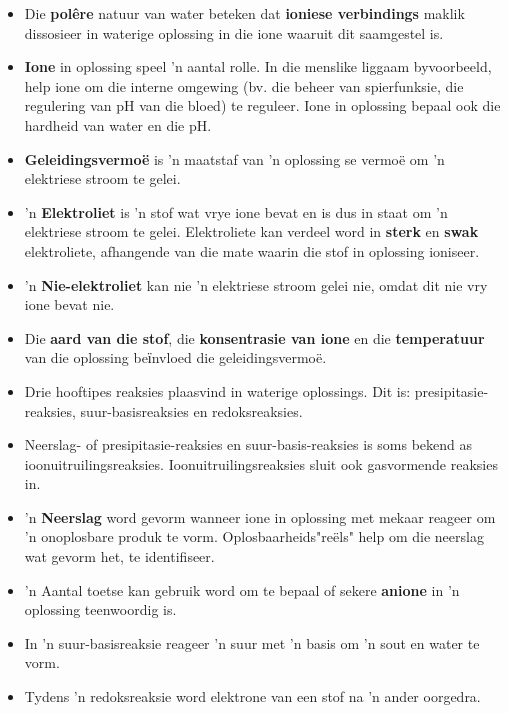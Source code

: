             \label{m38719*eip-903}\begin{itemize}[noitemsep]
            \label{m38719*uid95}\item Die \textbf{pol\^{e}re} natuur van water beteken dat \textbf{ioniese verbindings} maklik dissosieer in waterige oplossing in die ione waaruit dit saamgestel is. 
\label{m38719*uid96}\item \textbf{Ione} in oplossing speel 'n aantal rolle. In die menslike liggaam byvoorbeeld, help ione om die interne omgewing (bv. die beheer van spierfunksie, die regulering van pH van die bloed) te reguleer. Ione in oplossing bepaal ook die hardheid van water en die pH. 
\label{m38719*uid100}\item \textbf{Geleidingsvermo\"{e}} is 'n maatstaf van 'n oplossing se vermoë om 'n elektriese stroom te gelei.
\label{m38719*uid101}\item 'n \textbf{Elektroliet} is 'n stof wat vrye ione bevat en is dus in staat om  'n elektriese stroom te gelei. Elektroliete kan verdeel word in \textbf{sterk} en \textbf{swak} elektroliete, afhangende van die mate waarin die stof in oplossing ioniseer.
\label{m38719*uid102}\item 'n \textbf{Nie-elektroliet} kan nie  'n elektriese stroom gelei nie, omdat dit nie vry ione bevat nie.
\label{m38719*uid103}\item Die \textbf{aard van die stof}, die \textbf{konsentrasie van ione} en die \textbf{temperatuur} van die oplossing beїnvloed die geleidingsvermo\"{e}.
\label{m38719*uid0253}\item Drie hooftipes reaksies plaasvind in waterige oplossings. Dit is: presipitasie-reaksies, suur-basisreaksies en redoksreaksies.
\label{m38719*uid8923}\item Neerslag- of presipitasie-reaksies en suur-basis-reaksies is soms bekend as ioonuitruilingsreaksies. Ioonuitruilingsreaksies sluit ook gasvormende reaksies in.
\label{m38719*uid104}\item 'n \textbf{Neerslag} word gevorm wanneer ione in oplossing met mekaar reageer om 'n onoplosbare produk te vorm. Oplosbaarheids"re\"{e}ls" help om die neerslag wat gevorm het, te identifiseer.
\label{m38719*uid105}\item 'n Aantal toetse kan gebruik word om te bepaal of sekere \textbf{anione} in 'n oplossing teenwoordig is.
\label{m38719*id813}\item In 'n suur-basisreaksie reageer 'n suur met 'n basis om 'n sout en water te vorm.
\label{m38719*uid823}\item Tydens 'n redoksreaksie word elektrone van een stof na 'n ander oorgedra. 
\end{itemize}
